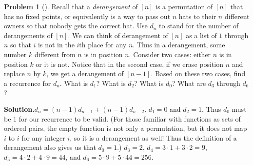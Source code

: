 \documentclass[10pt,]{book}
\theoremstyle{plain}
\theoremstyle{definition}
\newtheorem{activity}[project]{Problem}
\theoremstyle{definition}
\numberwithin{equation}{chapter}
\begin{document}
\begin{activity}[]\label{derangementrecurrence}
Recall that a \emph{derangement} of \([n]\) is a permutation of \([n]\) that has no fixed points, or equivalently is a way to pass out \(n\) hats to their \(n\) different owners so that nobody gets the correct hat. Use \(d_n\) to stand for the number of derangements of \([n]\). We can think of derangement of \([n]\) as a list of \(1\) through \(n\) so that \(i\) is not in the \(i\)th place for any \(n\). Thus in a derangement, some number \(k\) different from \(n\) is in position \(n\). Consider two cases: either \(n\) is in position \(k\) or it is not. Notice that in the second case, if we erase position \(n\) and replace \(n\) by \(k\), we get a derangement of \([n-1]\). Based on these two cases, find a recurrence for \(d_n\). What is \(d_1\)? What is \(d_2\)? What is \(d_0\)? What are \(d_3\) through \(d_6\)?%
\par\medskip\noindent%
\textbf{Solution.}\quad \(d_n = (n-1)d_{n-1} + (n-1)d_{n-2}\). \(d_1 = 0\) and \(d_2 = 1\). Thus \(d_0\) must be 1 for our recurrence to be valid. (For those familiar with functions as sets of ordered pairs, the empty function is not only a permutation, but it does not map \(i\) to \(i\) for any integer \(i\), so it is a derangement as well! Thus the definition of a derangement also gives us that \(d_0=1\).) \(d_3= 2\), \(d_4=3\cdot1+3\cdot 2=9\), \(d_5=4\cdot2+4\cdot 9 = 44\), and \(d_6 = 5\cdot9+5\cdot44 = 256\).%
\end{activity}
\typeout{************************************************}
\typeout{************************************************}
\end{document}

